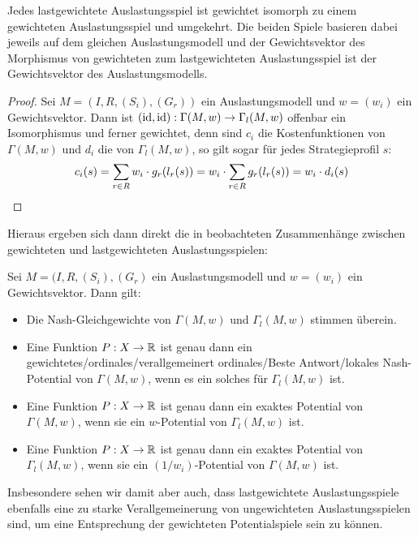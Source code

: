 \begin{lemma}
	Jedes lastgewichtete Auslastungsspiel ist gewichtet isomorph zu einem gewichteten Auslastungsspiel und umgekehrt. Die beiden Spiele basieren dabei jeweils auf dem gleichen Auslastungsmodell und der Gewichtsvektor des Morphismus von gewichteten zum lastgewichteten Auslastungsspiel ist der Gewichtsvektor des Auslastungsmodells.
\end{lemma}

\begin{proof}
	Sei $M = (I, R, (S_i), (G_r))$ ein Auslastungsmodell und $w = (w_i)$ ein Gewichtsvektor. Dann ist $(\mathrm{id}, \mathrm{id}): \Gamma(M, w) \to \Gamma_l(M,w)$ offenbar ein Isomorphismus und ferner gewichtet, denn sind $c_i$ die Kostenfunktionen von $\Gamma(M, w)$ und $d_i$ die von $\Gamma_l(M,w)$, so gilt sogar für jedes Strategieprofil $s$:
		\[c_i(s) = \sum_{r \in R} w_i\cdot g_r(l_r(s)) = w_i \cdot \sum_{r \in R} g_r(l_r(s)) = w_i \cdot d_i(s) \qedhere\]
\end{proof}

Hieraus ergeben sich dann direkt die in \cite{CharExGewPotinWCG} beobachteten Zusammenhänge zwischen gewichteten und lastgewichteten Auslastungsspielen:

\begin{kor}
	Sei $M = (I, R, (S_i), (G_r)$ ein Auslastungsmodell und $w = (w_i)$ ein Gewichtsvektor. Dann gilt:
	\begin{itemize}
		\item Die Nash-Gleichgewichte von $\Gamma(M, w)$ und $\Gamma_l(M,w)$ stimmen überein.
		\item Eine Funktion $P: X \to \mathbb{R}$ ist genau dann ein gewichtetes/ordinales/verallgemeinert ordinales/Beste Antwort/lokales Nash-Potential von $\Gamma(M, w)$, wenn es ein solches für $\Gamma_l(M,w)$ ist.
		\item Eine Funktion $P: X \to \mathbb{R}$ ist genau dann ein exaktes Potential von $\Gamma(M, w)$, wenn sie ein $w$-Potential von $\Gamma_l(M,w)$ ist.
		\item Eine Funktion $P: X \to \mathbb{R}$ ist genau dann ein exaktes Potential von $\Gamma_l(M, w)$, wenn sie ein $(1/w_i)$-Potential von $\Gamma(M,w)$ ist.		
	\end{itemize}
\end{kor}

Insbesondere sehen wir damit aber auch, dass lastgewichtete Auslastungsspiele ebenfalls eine zu starke Verallgemeinerung von ungewichteten Auslastungsspielen sind, um eine Entsprechung der gewichteten Potentialspiele sein zu können.


